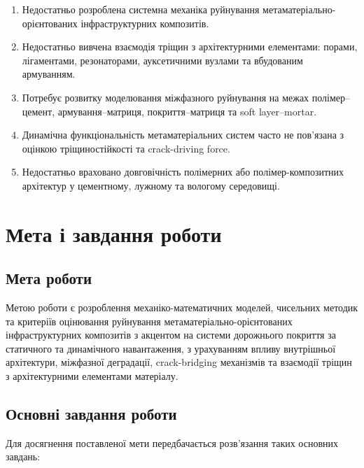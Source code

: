 \documentclass[12pt,a4paper]{article}
\begin{document}
\begin{enumerate}
	\item Недостатньо розроблена системна механіка руйнування метаматеріально-орієнтованих інфраструктурних композитів.
	\item Недостатньо вивчена взаємодія тріщин з архітектурними елементами: порами, лігаментами, резонаторами, ауксетичними вузлами та вбудованим армуванням.
	\item Потребує розвитку моделювання міжфазного руйнування на межах полімер--цемент, армування--матриця, покриття--матриця та soft layer--mortar.
	\item Динамічна функціональність метаматеріальних систем часто не пов'язана з оцінкою тріщиностійкості та crack-driving force.
	\item Недостатньо враховано довговічність полімерних або полімер-композитних архітектур у цементному, лужному та вологому середовищі.
\end{enumerate}

\section{Мета і завдання роботи}

\subsection{Мета роботи}

Метою роботи є розроблення механіко-математичних моделей, чисельних методик та критеріїв оцінювання руйнування метаматеріально-орієнтованих інфраструктурних композитів з акцентом на системи дорожнього покриття за статичного та динамічного навантаження, з урахуванням впливу внутрішньої архітектури, міжфазної деградації, crack-bridging механізмів та взаємодії тріщин з архітектурними елементами матеріалу.

\subsection{Основні завдання роботи}

Для досягнення поставленої мети передбачається розв'язання таких основних завдань:
\end{document}
